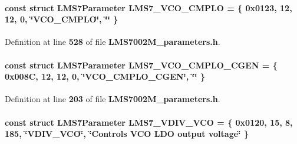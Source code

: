 \paragraph[{L\+M\+S7\+\_\+\+V\+C\+O\+\_\+\+C\+M\+P\+LO}]{\setlength{\rightskip}{0pt plus 5cm}const struct {\bf L\+M\+S7\+Parameter} L\+M\+S7\+\_\+\+V\+C\+O\+\_\+\+C\+M\+P\+LO = \{ 0x0123, 12, 12, 0, \char`\"{}\+V\+C\+O\+\_\+\+C\+M\+P\+L\+O\char`\"{}, \char`\"{}\char`\"{} \}\hspace{0.3cm}{\ttfamily [static]}}\label{LMS7002M__parameters_8h_ae12d0e1e7e9f0cdf36e3dadd51b3cf26}


Definition at line {\bf 528} of file {\bf L\+M\+S7002\+M\+\_\+parameters.\+h}.

\paragraph[{L\+M\+S7\+\_\+\+V\+C\+O\+\_\+\+C\+M\+P\+L\+O\+\_\+\+C\+G\+EN}]{\setlength{\rightskip}{0pt plus 5cm}const struct {\bf L\+M\+S7\+Parameter} L\+M\+S7\+\_\+\+V\+C\+O\+\_\+\+C\+M\+P\+L\+O\+\_\+\+C\+G\+EN = \{ 0x008\+C, 12, 12, 0, \char`\"{}\+V\+C\+O\+\_\+\+C\+M\+P\+L\+O\+\_\+\+C\+G\+E\+N\char`\"{}, \char`\"{}\char`\"{} \}\hspace{0.3cm}{\ttfamily [static]}}\label{LMS7002M__parameters_8h_ab2319a962f3f24865f99adefba4f8ee2}


Definition at line {\bf 203} of file {\bf L\+M\+S7002\+M\+\_\+parameters.\+h}.

\paragraph[{L\+M\+S7\+\_\+\+V\+D\+I\+V\+\_\+\+V\+CO}]{\setlength{\rightskip}{0pt plus 5cm}const struct {\bf L\+M\+S7\+Parameter} L\+M\+S7\+\_\+\+V\+D\+I\+V\+\_\+\+V\+CO = \{ 0x0120, 15, 8, 185, \char`\"{}\+V\+D\+I\+V\+\_\+\+V\+C\+O\char`\"{}, \char`\"{}\+Controls V\+C\+O L\+D\+O output voltage\char`\"{} \}\hspace{0.3cm}{\ttfamily [static]}}\label{LMS7002M__parameters_8h_a20394def43ec5c159988060a4d24f184}


